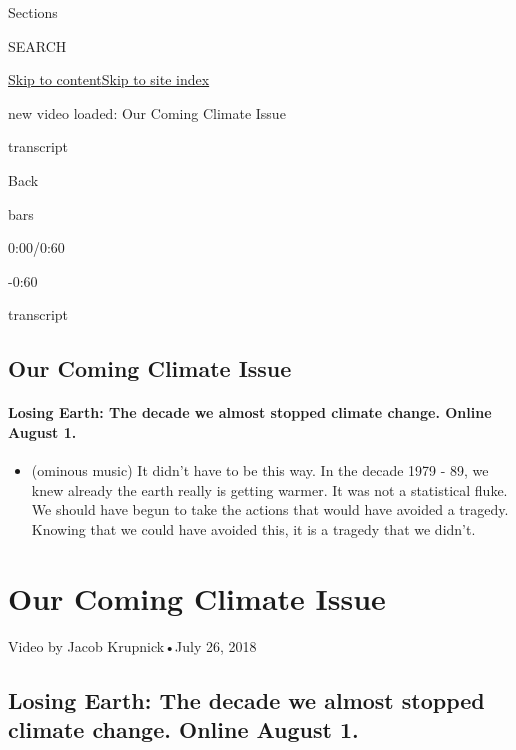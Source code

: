 Sections

SEARCH

\protect\hyperlink{site-content}{Skip to
content}\protect\hyperlink{site-index}{Skip to site index}

new video loaded: Our Coming Climate Issue

transcript

Back

bars

0:00/0:60

-0:60

transcript

\hypertarget{our-coming-climate-issue}{%
\subsection{Our Coming Climate Issue}\label{our-coming-climate-issue}}

\hypertarget{losing-earth-the-decade-we-almost-stopped-climate-change-online-august-1}{%
\paragraph{Losing Earth: The decade we almost stopped climate change.
Online August
1.}\label{losing-earth-the-decade-we-almost-stopped-climate-change-online-august-1}}

\begin{itemize}
\tightlist
\item
  (ominous music) It didn't have to be this way. In the decade 1979 -
  89, we knew already the earth really is getting warmer. It was not a
  statistical fluke. We should have begun to take the actions that would
  have avoided a tragedy. Knowing that we could have avoided this, it is
  a tragedy that we didn't.
\end{itemize}

\hypertarget{our-coming-climate-issue-1}{%
\section{Our Coming Climate Issue}\label{our-coming-climate-issue-1}}

Video by Jacob Krupnick•July 26, 2018

\hypertarget{losing-earth-the-decade-we-almost-stopped-climate-change-online-august-1-1}{%
\subsection{Losing Earth: The decade we almost stopped climate change.
Online August
1.}\label{losing-earth-the-decade-we-almost-stopped-climate-change-online-august-1-1}}

